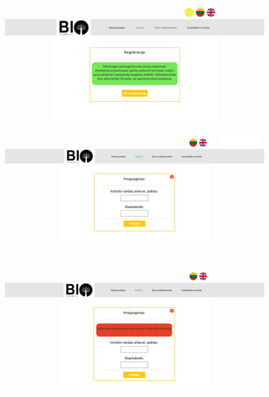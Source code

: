 \documentclass[a4paper,12pt]{article}
\begin{document}
\begin{figure}[!tph]
\hspace{-3cm}
\centering
\includegraphics[scale=0.5]{interfeisai/paskyrosPuslapisRegistracijaSekminga}
\label{fig:verticalcell}
\end{figure}
 
\begin{figure}[!tph]
\hspace{-3cm}
\centering
\includegraphics[scale=0.5]{interfeisai/paskyrosPuslapisPrisijungimas}
\label{fig:verticalcell}
\end{figure}

\begin{figure}[!tph]
\hspace{-3cm}
\centering
\includegraphics[scale=0.5]{interfeisai/paskyrosPuslapisPrisijungimasSuKlaida}
\label{fig:verticalcell}
\end{figure}
\end{document}
